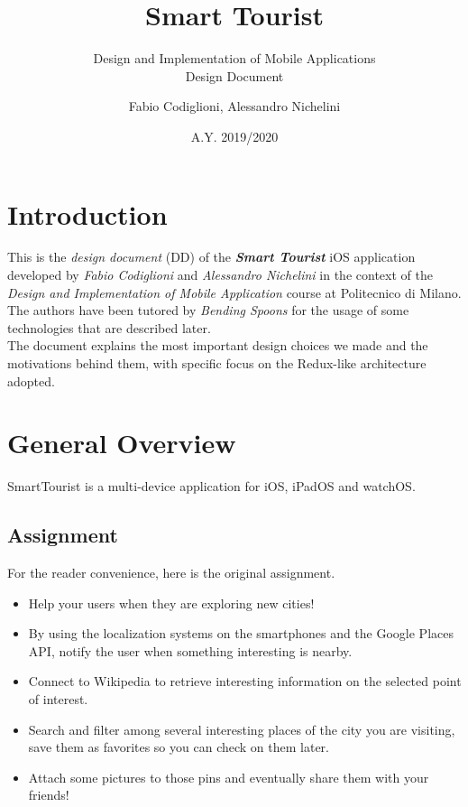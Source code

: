 \documentclass[a4paper, 11pt, parskip=half]{scrreprt}
\title{Smart Tourist}
\subtitle{Design and Implementation of Mobile Applications\\Design Document}
\date{A.Y. 2019/2020}
\author{Fabio Codiglioni, Alessandro Nichelini}
\theoremstyle{definition}
\begin{document}
\maketitle
\tableofcontents
\newpage
{}



\chapter{Introduction}

This is the \textit{design document} (DD) of the \textbf{\textit{Smart Tourist}} iOS application developed by \textit{Fabio Codiglioni} and \textit{Alessandro Nichelini} in the context of the \textit{Design and Implementation of Mobile Application} course at Politecnico di Milano. The authors have been tutored by \textit{Bending Spoons} for the usage of some technologies that are described later.\\
The document explains the most important design choices we made and the motivations behind them, with specific focus on the Redux-like architecture adopted.




\chapter{General Overview}

SmartTourist is a multi-device application for iOS, iPadOS and watchOS.

\section{Assignment}
For the reader convenience, here is the original assignment.
\begin{itemize}
    \item Help your users when they are exploring new cities!
    \item By using the localization systems on the smartphones and the Google Places API, notify the user when something interesting is nearby.
    \item Connect to Wikipedia to retrieve interesting information on the selected point of interest.
    \item Search and filter among several interesting places of the city you are visiting, save them as favorites so you can check on them later.
    \item Attach some pictures to those pins and eventually share them with your friends!
\end{itemize}
\end{document}

